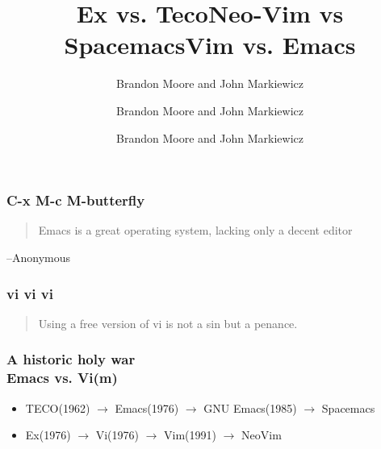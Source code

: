 \documentclass[8pt]{beamer}
\begin{document}
\title{Ex vs. Teco}
\author{Brandon Moore and John Markiewicz}
\date{}

\begin{frame}
	\titlepage
\end{frame}

\title{Neo-Vim vs Spacemacs}
\author{Brandon Moore and John Markiewicz}
\date{}

\begin{frame}
	\titlepage
\end{frame}

\title{Vim vs. Emacs}
\author{Brandon Moore and John Markiewicz}
\date{}

\begin{frame}
	\titlepage
\end{frame}

\begin{frame}
	\frametitle{C-x M-c M-butterfly}
  \begin{quote}
    Emacs is a great operating system, lacking only a decent editor
  \end{quote}
	\begin{flushright}
		--Anonymous
	\end{flushright}
\end{frame}

\begin{frame}
	\frametitle{vi vi vi}
  \begin{quote}
    Using a free version of vi is not a sin but a penance.
  \end{quote}
  \begin{flushright}
  \end{flushright}
\end{frame}

\begin{frame}
				\frametitle{A historic holy war\\Emacs vs. Vi(m)}
  \begin{itemize}
  \item TECO(1962) $\rightarrow$ Emacs(1976) $\rightarrow$ GNU Emacs(1985) $\rightarrow$ Spacemacs
	\item Ex(1976) $\rightarrow$ Vi(1976) $\rightarrow$ Vim(1991) $\rightarrow$ NeoVim
  \end{itemize}
\end{frame}
\end{document}

